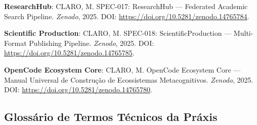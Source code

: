 \begin{enumerate}[leftmargin=*, label={[R\arabic*]}, resume]
  \item \textbf{ResearchHub}: CLARO, M. SPEC-017: ResearchHub — Federated Academic Search Pipeline. \textit{Zenodo}, 2025. DOI: \url{https://doi.org/10.5281/zenodo.14765784}.
  
  \item \textbf{Scientific Production}: CLARO, M. SPEC-018: ScientificProduction — Multi-Format Publishing Pipeline. \textit{Zenodo}, 2025. DOI: \url{https://doi.org/10.5281/zenodo.14765785}.
  
  \item \textbf{OpenCode Ecosystem Core}: CLARO, M. OpenCode Ecosystem Core — Manual Universal de Construção de Ecossistemas Metacognitivos. \textit{Zenodo}, 2025. DOI: \url{https://doi.org/10.5281/zenodo.14765780}.
\end{enumerate}

\subsection{Glossário de Termos Técnicos da Práxis}
\label{sec:glossario}


